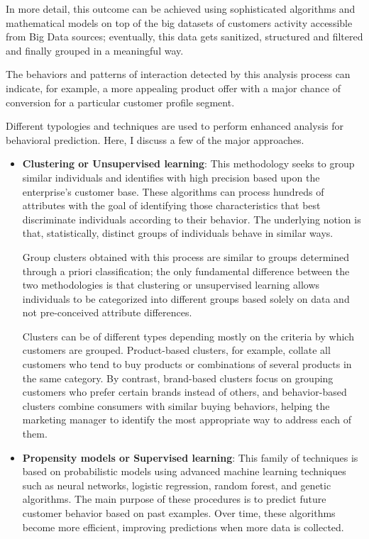 In more detail, this outcome can be achieved using sophisticated algorithms and mathematical models on top of the big datasets of customers activity accessible from Big Data sources; eventually, this data gets sanitized, structured and filtered and finally grouped in a meaningful way. 

The behaviors and patterns of interaction detected by this analysis process can indicate, for example, a more appealing product offer with a major chance of conversion for a particular customer profile segment.

Different typologies and techniques are used to perform enhanced analysis for behavioral prediction. Here, I discuss a few of the major approaches.

\begin{itemize}
    \item \textbf{Clustering or Unsupervised learning}:  This methodology seeks to group similar individuals and identifies with high precision based upon the enterprise's customer base. These algorithms can process hundreds of attributes with the goal of identifying those characteristics that best discriminate individuals according to their behavior. The underlying notion is that, statistically, distinct groups of individuals behave in similar ways. 
    
    Group clusters obtained with this process are similar to groups determined through a priori classification; the only fundamental difference between the two methodologies is that clustering or unsupervised learning allows individuals to be categorized into different groups based solely on data and not pre-conceived attribute differences. 
    
    Clusters can be of different types depending mostly on the criteria by which customers are grouped. Product-based clusters, for example, collate all customers who tend to buy products or combinations of several products in the same category. By contrast, brand-based clusters focus on grouping customers who prefer certain brands instead of others, and behavior-based clusters combine consumers with similar buying behaviors, helping the marketing manager to identify the most appropriate way to address each of them.

    \item \textbf{Propensity models or Supervised learning}: This family of techniques is based on probabilistic models using advanced machine learning techniques such as neural networks, logistic regression, random forest, and genetic algorithms. The main purpose of these procedures is to predict future customer behavior based on past examples. Over time, these algorithms become more efficient, improving predictions when more data is collected.


\end{itemize}
